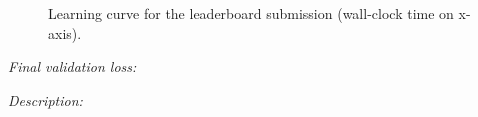 \begin{figure}[H]
    \centering
    \caption{Learning curve for the leaderboard submission (wall-clock time on x-axis).}
    \label{fig:leaderboard}
\end{figure}

\textit{Final validation loss:} %

\textit{Description:} %

